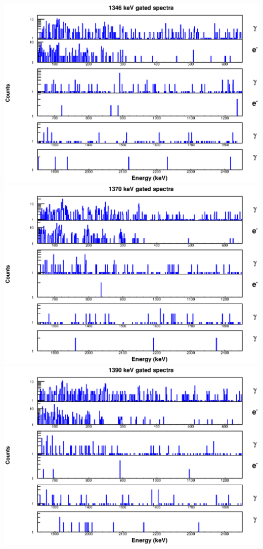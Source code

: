 \includegraphics[scale=0.8]{154Gd_Appendix/1346_combined.eps}
\includegraphics[scale=0.8]{154Gd_Appendix/1370_combined.eps}
\includegraphics[scale=0.8]{154Gd_Appendix/1390_combined.eps}
